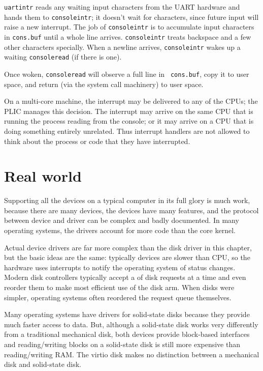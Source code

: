 {\tt uartintr}
reads any waiting input characters from the UART hardware
and hands them to {\tt consoleintr}; it doesn't
wait for characters, since future input will raise a new interrupt.
The job of {\tt consoleintr} is to accumulate input characters in
{\tt cons.buf} 
until a whole line arrives.
{\tt consoleintr} treats backspace and a few other characters
specially.
When a newline arrives, {\tt consoleintr} wakes up a
waiting {\tt consoleread} (if there is one).

Once woken, {\tt consoleread} will observe a full line in {\tt
  cons.buf}, copy it to user space, and return (via the system call
machinery) to user space.

On a multi-core machine, the interrupt may be delivered to any of the
CPUs; the PLIC manages this decision. The interrupt may arrive on the
same CPU that is running the process reading from the console; or it
may arrive on a CPU that is doing something entirely unrelated. Thus
interrupt handlers are not allowed to think about the process or code
that they have interrupted.

\section{Real world}

Supporting all the devices on a typical computer in its full glory is
much work, because there are many devices, the devices have many
features, and the protocol between device and driver can be complex
and badly documented.
In many operating systems, the drivers account for more code
than the core kernel.

Actual device drivers are far more complex than the disk driver in this chapter,
but the basic ideas are the same:
typically devices are slower than CPU, so the hardware uses
interrupts to notify the operating system of status changes.
Modern disk controllers typically
accept a 
of disk requests at a time and even reorder
them to make most efficient use of the disk arm.
When disks were simpler, operating systems often reordered the
request queue themselves.

Many operating systems have drivers for solid-state disks because they
provide much faster access to data.  But, although a solid-state disk
works very differently from a traditional mechanical disk, both
devices provide block-based interfaces and reading/writing blocks on a
solid-state disk is still more expensive than reading/writing RAM.
The virtio disk makes no distinction between a mechanical disk and
solid-state disk.

